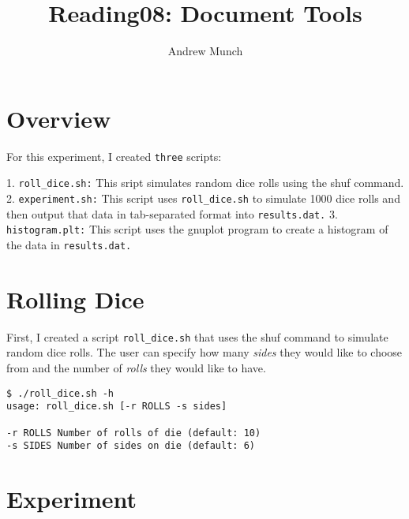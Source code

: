 \documentclass[letterpaper]{article}
\title{Reading08: Document Tools}
\date{}
\author{Andrew Munch}
\begin{document}
\maketitle


\section*{Overview}

For this experiment, I created \verb|three| scripts:

   1. \verb|roll_dice.sh:| This sript simulates random dice rolls using the shuf command.
   2. \verb|experiment.sh:| This script uses \verb|roll_dice.sh| to simulate 1000 dice rolls and then output that data in tab-separated format into \verb|results.dat.|
   3. \verb|histogram.plt:| This script uses the gnuplot program to create a histogram of the data in \verb|results.dat.|


\section*{Rolling Dice}

First, I created a script \verb|roll_dice.sh| that uses the shuf command to simulate random dice rolls.  The user can specify how many {\it sides} they would like to choose from and the number of {\it rolls} they would like to have.

\begin{verbatim}
$ ./roll_dice.sh -h
usage: roll_dice.sh [-r ROLLS -s sides]

-r ROLLS Number of rolls of die (default: 10)
-s SIDES Number of sides on die (default: 6)
\end{verbatim}


\section*{Experiment}
\end{document}
